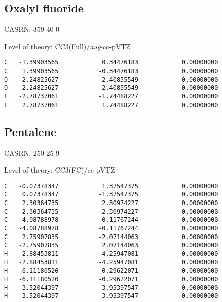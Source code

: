 \documentclass[journal=jctcce,manuscript=article,layout=traditional]{achemso}
\newcommand{\TZ}{cc-pVTZ}
\newcommand{\AVTZ}{\emph{aug}-cc-pVTZ}
\begin{document}
\subsection{Oxalyl fluoride}

CASRN: 359-40-0

\begin{singlespace}
\noindent Level of theory: CC3(Full)/{\AVTZ}
\begin{verbatim}
C   -1.39903565            0.34476183            0.00000000
C    1.39903565           -0.34476183            0.00000000
O   -2.24825627            2.40855549            0.00000000
O    2.24825627           -2.40855549            0.00000000
F   -2.78737061           -1.74488227            0.00000000
F    2.78737061            1.74488227            0.00000000
\end{verbatim}
\end{singlespace}


\subsection{Pentalene}

CASRN: 250-25-9

\begin{singlespace}
\noindent Level of theory: CC3(FC)/{\TZ}
\begin{verbatim}
C   -0.07378347            1.37547375            0.00000000
C    0.07378347           -1.37547375            0.00000000
C    2.30364735            2.30974227            0.00000000
C   -2.30364735           -2.30974227            0.00000000
C    4.08788978            0.11767244            0.00000000
C   -4.08788978           -0.11767244            0.00000000
C    2.75907835           -2.07144063            0.00000000
C   -2.75907835            2.07144063            0.00000000
H    2.88453811            4.25947081            0.00000000
H   -2.88453811           -4.25947081            0.00000000
H    6.11180520            0.29622071            0.00000000
H   -6.11180520           -0.29622071            0.00000000
H    3.52044397           -3.95397547            0.00000000
H   -3.52044397            3.95397547            0.00000000
\end{verbatim}
\end{singlespace}
\end{document}
